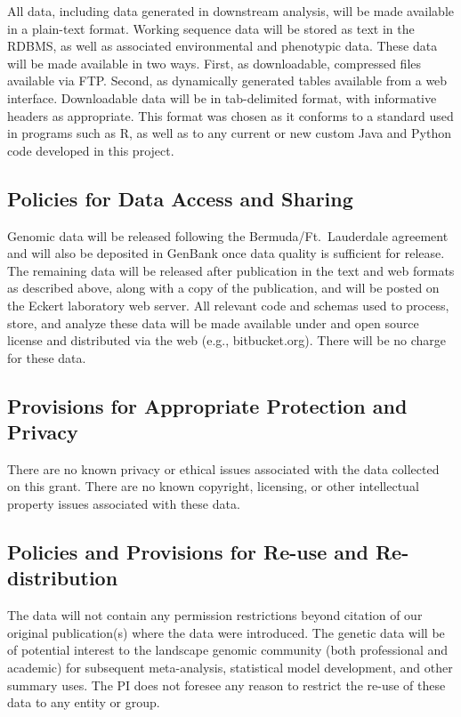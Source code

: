 All data, including data generated in downstream analysis, will be made available in a plain-text format.  Working sequence
data will be stored as text in the RDBMS, as well as associated environmental and phenotypic data.  These data will be 
made available in two ways.  First, as downloadable, compressed files available via FTP.  Second, as dynamically generated
tables available from a web interface.  Downloadable data will be in tab-delimited format, with informative headers 
as appropriate.  This format was chosen as it conforms to a standard used in programs such as R, as well as to any 
current or new custom Java and Python code developed in this project.

\subsection*{Policies for Data Access and Sharing}
Genomic data will be released following the Bermuda/Ft.\ Lauderdale agreement and will also be deposited in 
GenBank once data quality is sufficient for release. The remaining data will be released after publication in the 
text and web formats as described above, along with a copy of the publication, and will be posted on the Eckert laboratory 
web server. All relevant code and schemas used to process, store, and analyze these data will 
be made available under and open source license and distributed via the web (e.g., bitbucket.org).  There will be no 
charge for these data. 

\subsection*{Provisions for Appropriate Protection and Privacy}
There are no known privacy or ethical issues associated with the data collected on this grant. 
There are no known copyright, licensing, or other intellectual property issues associated with these data.

\subsection*{Policies and Provisions for Re-use and Re-distribution}
The data will not contain any permission restrictions beyond citation of our original publication(s) where the data 
were introduced. The genetic data will be of potential interest to the landscape genomic community (both 
professional and academic) for subsequent meta-analysis, statistical model development, and other summary 
uses. The PI does not foresee any reason to restrict the re-use of these data to any entity or group.

